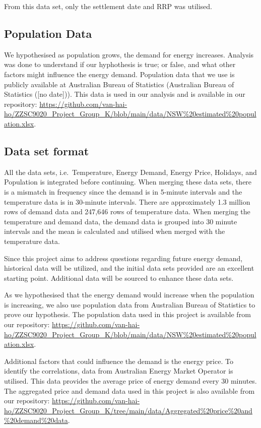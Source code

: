 \documentclass[mstat,12pt]{unswthesis}
\begin{document}
From this data set, only the settlement date and RRP was utilised.

\hypertarget{population-data}{%
\subsection{Population Data}\label{population-data}}

We hypothesised as population grows, the demand for energy increases.
Analysis was done to understand if our hyphothesis is true; or false,
and what other factors might influence the energy demand. Population
data that we use is publicly available at Australian Bureau of
Statistics (Australian Bureau of Statistics ({[}no date{]})). This data
is used in our analysis and is available in our repository:
\url{https://github.com/van-hai-ho/ZZSC9020_Project_Group_K/blob/main/data/NSW\%20estimated\%20population.xlsx}.

\hypertarget{data-set-format}{%
\subsection{Data set format}\label{data-set-format}}

All the data sets, i.e.~Temperature, Energy Demand, Energy Price,
Holidays, and Population is integrated before continuing. When merging
these data sets, there is a mismatch in frequency since the demand is in
5-minute intervals and the temperature data is in 30-minute intervals.
There are approximately 1.3 million rows of demand data and 247,646 rows
of temperature data. When merging the temperature and demand data, the
demand data is grouped into 30 minute intervals and the mean is
calculated and utilised when merged with the temperature data.

Since this project aims to address questions regarding future energy
demand, historical data will be utilized, and the initial data sets
provided are an excellent starting point. Additional data will be
sourced to enhance these data sets.

As we hypothesised that the energy demand would increase when the
population is increasing, we also use population data from Australian
Bureau of Statistics to prove our hypothesis. The population data used
in this project is available from our repository:
\url{https://github.com/van-hai-ho/ZZSC9020_Project_Group_K/blob/main/data/NSW\%20estimated\%20population.xlsx}.

Additional factors that could influence the demand is the energy price.
To identify the correlations, data from Australian Energy Market
Operator is utilised. This data provides the average price of energy
demand every 30 minutes. The aggregated price and demand data used in
this project is also available from our repository:
\url{https://github.com/van-hai-ho/ZZSC9020_Project_Group_K/tree/main/data/Aggregated\%20price\%20and\%20demand\%20data}.
\end{document}
